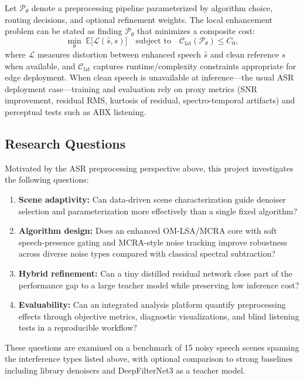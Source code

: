 Let $\mathcal{P}_\theta$ denote a preprocessing pipeline parameterized by algorithm choice, routing decisions, and optional refinement weights. The local enhancement problem can be stated as finding $\mathcal{P}_\theta$ that minimizes a composite cost:
\begin{equation}
  \min_{\theta}\; \mathbb{E}\bigl[\mathcal{L}(\hat{s}, s)\bigr]
  \quad \text{subject to} \quad
  \mathcal{C}_{\mathrm{lat}}(\mathcal{P}_\theta) \le C_0,
  \label{eq:objective}
\end{equation}
where $\mathcal{L}$ measures distortion between enhanced speech $\hat{s}$ and clean reference $s$ when available, and $\mathcal{C}_{\mathrm{lat}}$ captures runtime/complexity constraints appropriate for edge deployment. When clean speech is unavailable at inference---the usual ASR deployment case---training and evaluation rely on proxy metrics (SNR improvement, residual RMS, kurtosis of residual, spectro-temporal artifacts) and perceptual tests such as ABX listening.

\subsection{Research Questions}

Motivated by the ASR preprocessing perspective above, this project investigates the following questions:

\begin{enumerate}
  \item[RQ1.] \textbf{Scene adaptivity:} Can data-driven scene characterization guide denoiser selection and parameterization more effectively than a single fixed algorithm?
  \item[RQ2.] \textbf{Algorithm design:} Does an enhanced OM-LSA/MCRA core with soft speech-presence gating and MCRA-style noise tracking improve robustness across diverse noise types compared with classical spectral subtraction?
  \item[RQ3.] \textbf{Hybrid refinement:} Can a tiny distilled residual network close part of the performance gap to a large teacher model while preserving low inference cost?
  \item[RQ4.] \textbf{Evaluability:} Can an integrated analysis platform quantify preprocessing effects through objective metrics, diagnostic visualizations, and blind listening tests in a reproducible workflow?
\end{enumerate}

These questions are examined on a benchmark of 15 noisy speech scenes spanning the interference types listed above, with optional comparison to strong baselines including library denoisers and DeepFilterNet3 as a teacher model.

